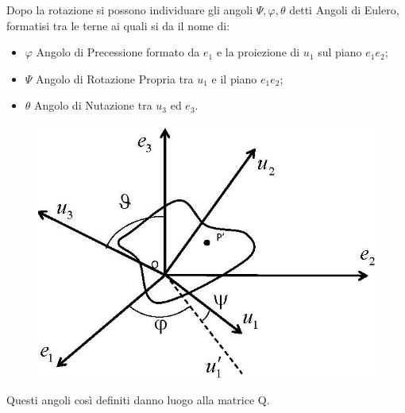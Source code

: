 \documentclass{article}
\begin{document}
\begin{adjustwidth}{2in}{}
\newpage
Dopo la rotazione si possono individuare gli angoli $\Psi, \varphi, \theta$ detti Angoli di Eulero, formatisi tra le terne ai quali si da il nome di: 
\begin{itemize}
	\item $\varphi$ Angolo di Precessione formato da $e_{1}$ e la proiezione di $u_{1}$ sul piano $e_{1}e_{2}$; 
	\item $\Psi$ Angolo di Rotazione Propria tra $u_{1}$ e il piano $e_{1}e_{2}$;
	\item $\theta$ Angolo di Nutazione tra $u_{3}$ ed $e_{3}$.
\end{itemize}
\begin{figure}[H]
	\centering
	\includegraphics[width=0.25\linewidth]{"immagini/1.PARTE1_Pagina_20"}
\end{figure}
Questi angoli così definiti danno luogo alla matrice Q. 


\end{adjustwidth}
\end{document}
